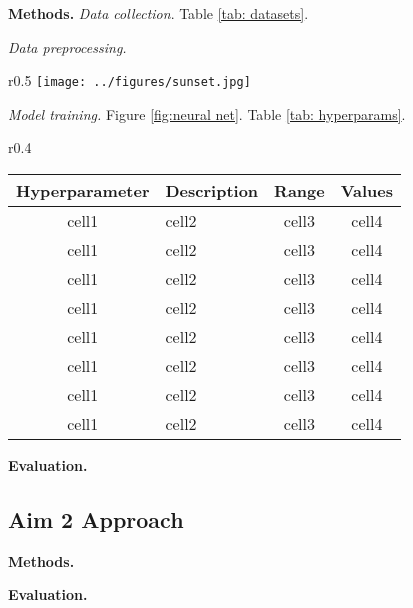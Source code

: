 \documentclass[11pt]{article}
\begin{document}
\textbf{Methods.} 
\textit{Data collection}. 
Table \ref{tab: datasets}. \lipsum[99]

\textit{Data preprocessing.}
\lipsum[100-101]

\begin{wrapfigure}{r}{0.5\textwidth}
	\footnotesize
	\centering
   	\texttt{[image: ../figures/sunset.jpg]}
	 \caption{Caption}
   	\label{fig:neural net}
   	\vspace{-1em}
\end{wrapfigure}

\textit{Model training.} 
Figure \ref{fig:neural net}. Table \ref{tab: hyperparams}.  
\lipsum[101-102]

\begin{wraptable}{r}{0.4\textwidth}
	\footnotesize
	\centering
	\caption{Caption}
	\label{tab: hyperparams}
	\begin{tabular}{ |c|l|c|c| }
	\hline
	\textbf{Hyperparameter} & \textbf{Description} & \textbf{Range}& \textbf{Values} \\
	\hline
	cell1 & cell2 & cell3 & cell4 \\
	\hline
	cell1 & cell2 & cell3 & cell4 \\
	\hline
	cell1 & cell2 & cell3 & cell4 \\
	\hline
	cell1 & cell2 & cell3 & cell4 \\
	\hline
	cell1 & cell2 & cell3 & cell4 \\
	\hline
	cell1 & cell2 & cell3 & cell4 \\
	\hline
	cell1 & cell2 & cell3 & cell4 \\
	\hline
	cell1 & cell2 & cell3 & cell4 \\
	\hline
	\end{tabular}
\end{wraptable}

\lipsum[104-106] 

\textbf{Evaluation.} 
\lipsum[107-109]


\subsection*{Aim 2 Approach}
\lipsum[60-61]

\textbf{Methods.} 

\lipsum[113-114]

\textbf{Evaluation.} 
\lipsum[115]
\end{document}
